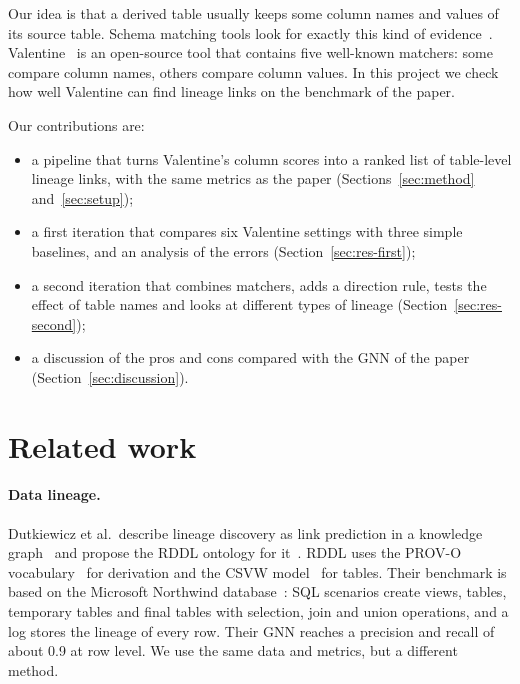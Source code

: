 \documentclass[11pt,a4paper]{article}
\begin{document}
Our idea is that a derived table usually keeps some column names and values of its source table. Schema
matching tools look for exactly this kind of evidence~\cite{rahm2001survey}. Valentine~\cite{koutras2021valentine}
is an open-source tool that contains five well-known matchers: some compare column names, others compare column
values. In this project we check how well Valentine can find lineage links on the benchmark of the paper.

Our contributions are:
\begin{itemize}
  \item a pipeline that turns Valentine's column scores into a ranked list of table-level lineage links, with the
        same metrics as the paper (Sections~\ref{sec:method} and~\ref{sec:setup});
  \item a first iteration that compares six Valentine settings with three simple baselines, and an analysis of
        the errors (Section~\ref{sec:res-first});
  \item a second iteration that combines matchers, adds a direction rule, tests the effect of table names and
        looks at different types of lineage (Section~\ref{sec:res-second});
  \item a discussion of the pros and cons compared with the GNN of the paper (Section~\ref{sec:discussion}).
\end{itemize}

\section{Related work}

\paragraph{Data lineage.} Dutkiewicz et al.\ describe lineage discovery as link prediction in a knowledge
graph~\cite{dutkiewicz2026kg} and propose the RDDL ontology for it~\cite{dutkiewicz2026rddl}. RDDL uses the PROV-O
vocabulary~\cite{lebo2013provo} for derivation and the CSVW model~\cite{tennison2015csvw} for tables. Their
benchmark is based on the Microsoft Northwind database~\cite{northwind}: SQL scenarios create views, tables,
temporary tables and final tables with selection, join and union operations, and a log stores the lineage of every
row. Their GNN reaches a precision and recall of about 0.9 at row level. We use the same data and metrics, but a
different method.
\end{document}
